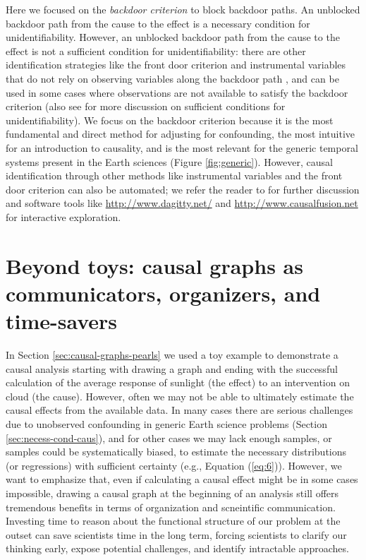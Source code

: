 \documentclass[12pt]{article}
\begin{document}
Here we focused on the \emph{backdoor criterion} to block backdoor
paths. An unblocked backdoor path from the cause to the effect is a
necessary condition for unidentifiability. However, an unblocked
backdoor path from the cause to the effect is not a sufficient
condition for unidentifiability: there are other identification
strategies like the front door criterion and instrumental variables
that do not rely on observing variables along the backdoor path
\citep{pearl2009causality}, and can be used in some cases where
observations are not available to satisfy the backdoor criterion (also
see \citet{tian2002general} for more discussion on sufficient
conditions for unidentifiability). We focus on the backdoor criterion
because it is the most fundamental and direct method for adjusting for
confounding, the most intuitive for an introduction to causality, and
is the most relevant for the generic temporal systems present in the
Earth sciences (Figure \ref{fig:generic}). However, causal
identification through other methods like instrumental variables and
the front door criterion can also be automated; we refer the reader to
\citet{pearl2009causality} for further discussion and software tools
like \url{http://www.dagitty.net/} and
\url{http://www.causalfusion.net} for interactive exploration.


\section{Beyond toys: causal graphs as communicators, organizers, and
  time-savers}\label{sec:causal-graphs-as}

In Section \ref{sec:causal-graphs-pearls} we used a toy example to
demonstrate a causal analysis starting with drawing a graph and ending
with the successful calculation of the average response of sunlight
(the effect) to an intervention on cloud (the cause). However, often
we may not be able to ultimately estimate the causal effects from the
available data. In many cases there are serious challenges due to
unobserved confounding in generic Earth science problems (Section
\ref{sec:necess-cond-caus}), and for other cases we may lack enough
samples, or samples could be systematically biased, to estimate the
necessary distributions (or regressions) with sufficient certainty
(e.g., Equation (\ref{eq:6})). However, we want to emphasize that,
even if calculating a causal effect might be in some cases impossible,
drawing a causal graph at the beginning of an analysis still offers
tremendous benefits in terms of organization and scneintific
communication. Investing time to reason about the functional structure
of our problem at the outset can save scientists time in the long
term, forcing scientists to clarify our thinking early, expose
potential challenges, and identify intractable approaches.
\end{document}
